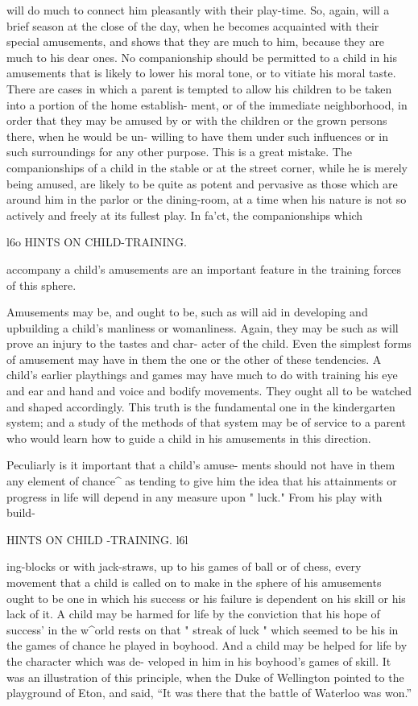 \documentclass[
]{book}
\begin{document}
will do much to connect him pleasantly with their play-time. So, again, will a brief season at the close of the day, when he becomes acquainted with their special amusements, and shows that they are much to him, because they are much to his dear ones. No companionship should be permitted to a child in his amusements that is likely to lower his moral tone, or to vitiate his moral taste. There are cases in which a parent is tempted to allow his children to be taken into a portion of the home establish- ment, or of the immediate neighborhood, in order that they may be amused by or with the children or the grown persons there, when he would be un- willing to have them under such influences or in such surroundings for any other purpose. This is a great mistake. The companionships of a child in the stable or at the street corner, while he is merely being amused, are likely to be quite as potent and pervasive as those which are around him in the parlor or the dining-room, at a time when his nature is not so actively and freely at its fullest play. In fa'ct, the companionships which

l6o HINTS ON CHILD-TRAINING.

accompany a child's amusements are an important feature in the training forces of this sphere.

Amusements may be, and ought to be, such as will aid in developing and upbuilding a child's manliness or womanliness. Again, they may be such as will prove an injury to the tastes and char- acter of the child. Even the simplest forms of amusement may have in them the one or the other of these tendencies. A child's earlier playthings and games may have much to do with training his eye and ear and hand and voice and bodify movements. They ought all to be watched and shaped accordingly. This truth is the fundamental one in the kindergarten system; and a study of the methods of that system may be of service to a parent who would learn how to guide a child in his amusements in this direction.

Peculiarly is it important that a child's amuse- ments should not have in them any element of chance\^{} as tending to give him the idea that his attainments or progress in life will depend in any measure upon " luck." From his play with build-

HINTS ON CHILD -TRAINING. l6l

ing-blocks or with jack-straws, up to his games of ball or of chess, every movement that a child is called on to make in the sphere of his amusements ought to be one in which his success or his failure is dependent on his skill or his lack of it. A child may be harmed for life by the conviction that his hope of success' in the w\^{}orld rests on that " streak of luck " which seemed to be his in the games of chance he played in boyhood. And a child may be helped for life by the character which was de- veloped in him in his boyhood's games of skill. It was an illustration of this principle, when the Duke of Wellington pointed to the playground of Eton, and said, ``It was there that the battle of Waterloo was won.''
\end{document}
